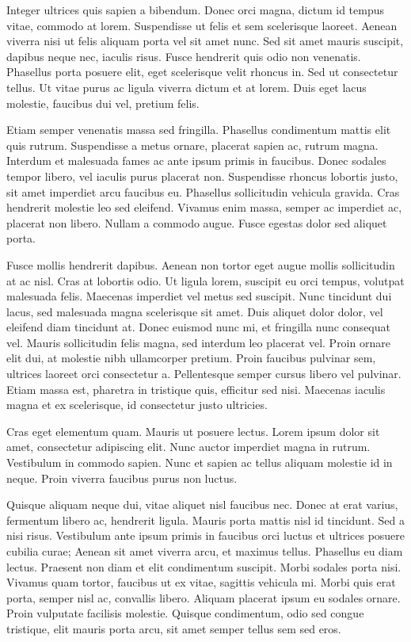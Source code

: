 \documentclass{homework}
\begin{document}
Integer ultrices quis sapien a bibendum. Donec orci magna, dictum id tempus vitae, commodo at lorem. Suspendisse ut felis et sem scelerisque laoreet. Aenean viverra nisi ut felis aliquam porta vel sit amet nunc. Sed sit amet mauris suscipit, dapibus neque nec, iaculis risus. Fusce hendrerit quis odio non venenatis. Phasellus porta posuere elit, eget scelerisque velit rhoncus in. Sed ut consectetur tellus. Ut vitae purus ac ligula viverra dictum et at lorem. Duis eget lacus molestie, faucibus dui vel, pretium felis.

Etiam semper venenatis massa sed fringilla. Phasellus condimentum mattis elit quis rutrum. Suspendisse a metus ornare, placerat sapien ac, rutrum magna. Interdum et malesuada fames ac ante ipsum primis in faucibus. Donec sodales tempor libero, vel iaculis purus placerat non. Suspendisse rhoncus lobortis justo, sit amet imperdiet arcu faucibus eu. Phasellus sollicitudin vehicula gravida. Cras hendrerit molestie leo sed eleifend. Vivamus enim massa, semper ac imperdiet ac, placerat non libero. Nullam a commodo augue. Fusce egestas dolor sed aliquet porta.

Fusce mollis hendrerit dapibus. Aenean non tortor eget augue mollis sollicitudin at ac nisl. Cras at lobortis odio. Ut ligula lorem, suscipit eu orci tempus, volutpat malesuada felis. Maecenas imperdiet vel metus sed suscipit. Nunc tincidunt dui lacus, sed malesuada magna scelerisque sit amet. Duis aliquet dolor dolor, vel eleifend diam tincidunt at. Donec euismod nunc mi, et fringilla nunc consequat vel. Mauris sollicitudin felis magna, sed interdum leo placerat vel. Proin ornare elit dui, at molestie nibh ullamcorper pretium. Proin faucibus pulvinar sem, ultrices laoreet orci consectetur a. Pellentesque semper cursus libero vel pulvinar. Etiam massa est, pharetra in tristique quis, efficitur sed nisi. Maecenas iaculis magna et ex scelerisque, id consectetur justo ultricies.

Cras eget elementum quam. Mauris ut posuere lectus. Lorem ipsum dolor sit amet, consectetur adipiscing elit. Nunc auctor imperdiet magna in rutrum. Vestibulum in commodo sapien. Nunc et sapien ac tellus aliquam molestie id in neque. Proin viverra faucibus purus non luctus.

Quisque aliquam neque dui, vitae aliquet nisl faucibus nec. Donec at erat varius, fermentum libero ac, hendrerit ligula. Mauris porta mattis nisl id tincidunt. Sed a nisi risus. Vestibulum ante ipsum primis in faucibus orci luctus et ultrices posuere cubilia curae; Aenean sit amet viverra arcu, et maximus tellus. Phasellus eu diam lectus. Praesent non diam et elit condimentum suscipit. Morbi sodales porta nisi. Vivamus quam tortor, faucibus ut ex vitae, sagittis vehicula mi. Morbi quis erat porta, semper nisl ac, convallis libero. Aliquam placerat ipsum eu sodales ornare. Proin vulputate facilisis molestie. Quisque condimentum, odio sed congue tristique, elit mauris porta arcu, sit amet semper tellus sem sed eros.
\end{document}
